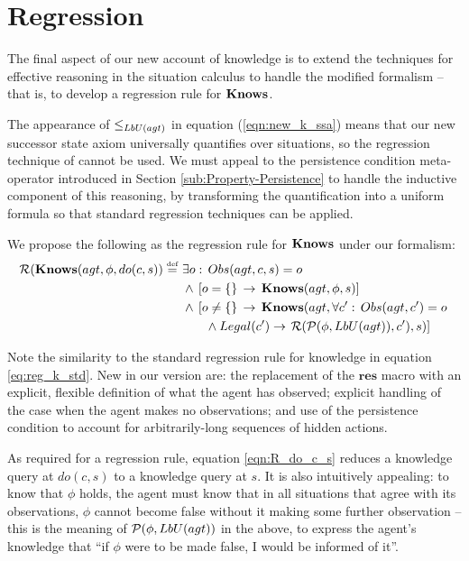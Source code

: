 \section{Regression\label{sec:Knowledge:Regression}}

The final aspect of our new account of knowledge is to extend the
techniques for effective reasoning in the situation calculus to handle
the modified formalism -- that is, to develop a regression rule for
$\mathbf{Knows}$.

The appearance of $\leq_{LbU(agt)}$ in equation (\ref{eqn:new_k_ssa})
means that our new successor state axiom universally quantifies over
situations, so the regression technique of \citep{scherl03sc_knowledge}
cannot be used. We must appeal to the persistence condition meta-operator
introduced in Section \ref{sub:Property-Persistence} to handle the
inductive component of this reasoning, by transforming the quantification
into a uniform formula so that standard regression techniques can
be applied.

We propose the following as the regression rule for $\mathbf{Knows}$ under
our formalism:\begin{align}
\mathcal{R}(\mathbf{Knows}(agt,\phi,do(c,s))\stackrel{\mbox{\tiny def}}{=}\,\, & \exists o:\, Obs(agt,c,s)=o\nonumber \\
 & \wedge\,\left[o=\{\}\,\rightarrow\,\mathbf{Knows}(agt,\phi,s)\right]\nonumber \\
 & \wedge\,\left[o\neq\{\}\,\rightarrow\,\mathbf{Knows}(agt,\forall c':\, Obs(agt,c')=o\right.\nonumber \\
 & \,\,\,\,\,\,\,\,\,\,\,\wedge Legal(c')\rightarrow\left.\mathcal{R}(\mathcal{P}(\phi,LbU(agt)),c'),s)\right]\label{eqn:R_do_c_s}\end{align}


Note the similarity to the standard regression rule for knowledge
in equation \eqref{eq:reg_k_std}. New in our version are: the replacement
of the $\mathbf{res}$ macro with an explicit, flexible definition
of what the agent has observed; explicit handling of the case when
the agent makes no observations; and use of the persistence condition
to account for arbitrarily-long sequences of hidden actions.

As required for a regression rule, equation \eqref{eqn:R_do_c_s}
reduces a knowledge query at $do(c,s)$ to a knowledge query at $s$.
It is also intuitively appealing: to know that $\phi$ holds, the
agent must know that in all situations that agree with its observations,
$\phi$ cannot become false without it making some further observation
-- this is the meaning of $\mathcal{P}(\phi,LbU(agt))$ in the above, to
express the agent's knowledge that {}``if $\phi$ were to be made
false, I would be informed of it''.

